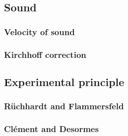 \documentclass{subfiles}
\begin{document}

    \subsection{Sound}

        \subsubsection*{Velocity of sound}

        \subsubsection*{Kirchhoff correction}

        \subsection{Experimental principle}

        \subsubsection*{Rüchhardt and Flammersfeld}

        \subsubsection*{Clément and Desormes}


\end{document}

